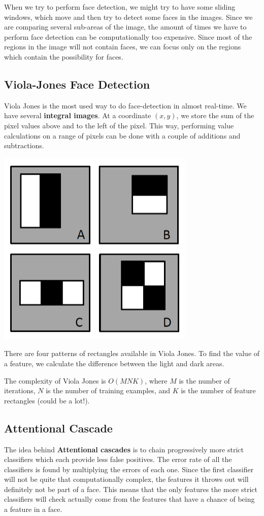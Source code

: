 \documentclass{tufte-handout}
\begin{document}
When we try to perform face detection, we might try to have some sliding windows, which move and then try 
	to detect some faces in the images. 
Since we are comparing several sub-areas of the image, the amount of times we have to perform face detection 
	can be computationally too expensive. 
Since most of the regions in the image will not contain faces, we can focus only on the regions which contain
	the possibility for faces.

\subsection{Viola-Jones Face Detection}
	Viola Jones is the most used way to do face-detection in almost real-time.
	We have several \textbf{integral images}. At a coordinate $(x,y)$, we store the sum of the pixel values above
		and to the left of the pixel. 
	This way, performing value calculations on a range of pixels can be done with a couple of additions and 
		subtractions.
	\begin{marginfigure}
			\includegraphics[scale=0.3]{rect_features}
			\caption{There are four patterns of rectangles available in Viola Jones. To find the value of a
				feature, we calculate the difference between the light and dark areas.}
	\end{marginfigure}

	The complexity of Viola Jones is $O(MNK)$, where $M$ is the number of iterations, $N$ is the number of 
		training examples, and $K$ is the number of feature rectangles (could be a lot!).

\subsection{Attentional Cascade}
The idea behind \textbf{Attentional cascades} is to chain progressively more strict classifiers which 
	each provide less false positives.
The error rate of all the classifiers is found by multiplying the errors of each one. 
Since the first classifier	will not be quite that computationally complex, the features it throws
	out will definitely not be part of a face. 
This means that the only features the more strict classifiers will check actually come from the features that
	have a chance of being a feature in a face.
\end{document}

